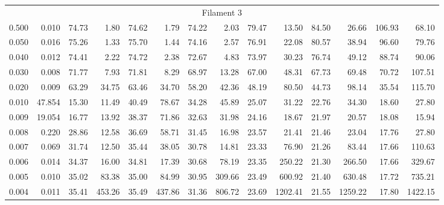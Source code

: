 \begin{tabular}{@{}lrrrrrrrrrrrrr@{}}
\midrule
\multicolumn{14}{c}{Filament 3} \\
\cmidrule{1-14}
0.500 & 0.010 & 74.73 & 1.80 & 74.62 & 1.79 & 74.22 & 2.03 & 79.47 & 13.50 & 84.50 & 26.66 & 106.93 & 68.10 \\
0.050 & 0.016 & 75.26 & 1.33 & 75.70 & 1.44 & 74.16 & 2.57 & 76.91 & 22.08 & 80.57 & 38.94 & 96.60 & 79.76 \\
0.040 & 0.012 & 74.41 & 2.22 & 74.72 & 2.38 & 72.67 & 4.83 & 73.97 & 30.23 & 76.74 & 49.12 & 88.74 & 90.06 \\
0.030 & 0.008 & 71.77 & 7.93 & 71.81 & 8.29 & 68.97 & 13.28 & 67.00 & 48.31 & 67.73 & 69.48 & 70.72 & 107.51 \\
0.020 & 0.009 & 63.29 & 34.75 & 63.46 & 34.70 & 58.20 & 42.36 & 48.19 & 80.50 & 44.73 & 98.14 & 35.54 & 115.70 \\
0.010 & 47.854 & 15.30 & 11.49 & 40.49 & 78.67 & 34.28 & 45.89 & 25.07 & 31.22 & 22.76 & 34.30 & 18.60 & 27.80 \\
0.009 & 19.054 & 16.77 & 13.92 & 38.37 & 71.86 & 32.63 & 31.98 & 24.16 & 18.67 & 21.97 & 20.57 & 18.08 & 15.94 \\
0.008 & 0.220 & 28.86 & 12.58 & 36.69 & 58.71 & 31.45 & 16.98 & 23.57 & 21.41 & 21.46 & 23.04 & 17.76 & 27.80 \\
0.007 & 0.069 & 31.74 & 12.50 & 35.44 & 38.05 & 30.78 & 14.81 & 23.33 & 76.90 & 21.26 & 83.44 & 17.66 & 110.63 \\
0.006 & 0.014 & 34.37 & 16.00 & 34.81 & 17.39 & 30.68 & 78.19 & 23.35 & 250.22 & 21.30 & 266.50 & 17.66 & 329.67 \\
0.005 & 0.010 & 35.02 & 83.38 & 35.00 & 84.99 & 30.95 & 309.66 & 23.49 & 600.92 & 21.40 & 630.48 & 17.72 & 735.21 \\
0.004 & 0.011 & 35.41 & 453.26 & 35.49 & 437.86 & 31.36 & 806.72 & 23.69 & 1202.41 & 21.55 & 1259.22 & 17.80 & 1422.15 \\


\end{tabular}
